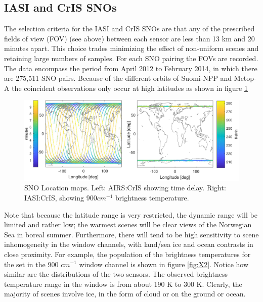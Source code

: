 \documentclass[twocolumn,10pt]{article}
\begin{document}
\subsection{IASI and CrIS SNOs}
The selection criteria for the IASI and CrIS SNOs are that any of the prescribed fields of view (FOV) (see above) between each sensor are less than 13 km and 20 minutes apart. This choice trades minimizing the effect of non-uniform scenes and retaining large numbers of samples.  For each SNO pairing the FOVs are recorded. The data encompass the period from April 2012 to February 2014, in which there are 275,511 SNO pairs. Because of the different orbits
of Suomi-NPP and Metop-A the coincident observations only occur at high latitudes as
shown in figure \ref{fig:X1}

\begin{figure}[htb]
\centering
\includegraphics[width=\linewidth]{./figs/AC_IC_jplSNO_maps.pdf}
\caption{
  SNO Location maps. Left: AIRS:CrIS showing time delay. Right: IASI:CrIS, showing $900 cm^{-1}$ brightness temperature.}
\label{fig:X1}
\end{figure}

Note that because the latitude range is very restricted, the dynamic range will be limited and rather low; the warmest scenes will be clear views of the Norwegian Sea in boreal summer.  Furthermore, there will tend to be high sensitivity to scene inhomogeneity in the window channels, with land/sea ice and ocean contrasts in close proximity. For example, the population of
the brightness temperatures for the set in the 900 $cm^{-1}$ window channel is shown in figure \ref{fig:X2}. Notice how similar are the distributions of the two sensors.
The observed brightness temperature range in the window is from about 190 K to 300 K. Clearly,
the majority of scenes involve ice, in the form of cloud or on the ground or ocean.
\end{document}
